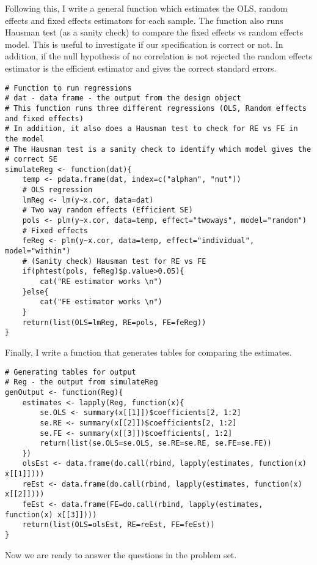 \documentclass{article}
\begin{document}
Following this, I write a general function which estimates the OLS,
random effects and fixed effects estimators for each sample. The
function also runs Hausman test (as a sanity check) to compare the
fixed effects vs random effects model. This is useful to investigate
if our specification is correct or not. In addition, if the null
hypothesis of no correlation is not rejected the random effects
estimator is the efficient estimator and gives the correct standard
errors. 
\begin{verbatim}
# Function to run regressions
# dat - data frame - the output from the design object
# This function runs three different regressions (OLS, Random effects and fixed effects)
# In addition, it also does a Hausman test to check for RE vs FE in the model
# The Hausman test is a sanity check to identify which model gives the
# correct SE
simulateReg <- function(dat){
    temp <- pdata.frame(dat, index=c("alphan", "nut"))
    # OLS regression
    lmReg <- lm(y~x.cor, data=dat)
    # Two way random effects (Efficient SE)
    pols <- plm(y~x.cor, data=temp, effect="twoways", model="random")
    # Fixed effects
    feReg <- plm(y~x.cor, data=temp, effect="individual", model="within")
    # (Sanity check) Hausman test for RE vs FE
    if(phtest(pols, feReg)$p.value>0.05){
        cat("RE estimator works \n")
    }else{
        cat("FE estimator works \n")
    }
    return(list(OLS=lmReg, RE=pols, FE=feReg))    
}
\end{verbatim}
Finally, I write a function that generates tables for comparing the
estimates. 
\begin{verbatim}
# Generating tables for output
# Reg - the output from simulateReg 
genOutput <- function(Reg){
    estimates <- lapply(Reg, function(x){
        se.OLS <- summary(x[[1]])$coefficients[2, 1:2]
        se.RE <- summary(x[[2]])$coefficients[2, 1:2]
        se.FE <- summary(x[[3]])$coefficients[, 1:2]
        return(list(se.OLS=se.OLS, se.RE=se.RE, se.FE=se.FE))
    })
    olsEst <- data.frame(do.call(rbind, lapply(estimates, function(x) x[[1]])))
    reEst <- data.frame(do.call(rbind, lapply(estimates, function(x) x[[2]])))
    feEst <- data.frame(FE=do.call(rbind, lapply(estimates, function(x) x[[3]])))
    return(list(OLS=olsEst, RE=reEst, FE=feEst))
}
\end{verbatim}
Now we are ready to answer the questions in the problem set.
\end{document}
